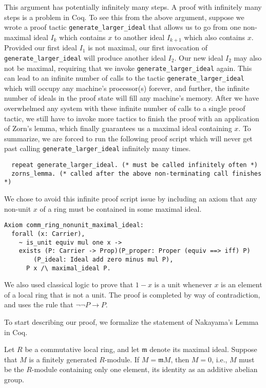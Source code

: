 \documentclass{article}
\begin{document}
This argument has potentially infinitely many steps. A proof with infinitely
many steps is a problem in Coq. To see this from the above argument, suppose we
wrote a proof tactic \texttt{generate_larger_ideal} that allows us to
go from one non-maximal ideal \(I_{k}\) which contains \(x\) to another ideal
\(I_{k+1}\) which also contains \(x\). Provided our first ideal \(I_{1}\) is
not maximal, our first invocation of \texttt{generate_larger_ideal}
will produce another ideal \(I_{2}\). Our new ideal \(I_{2}\) may also not be
maximal, requiring that we invoke \texttt{generate_larger_ideal}
again. This can lead to an infinite number of calls to the tactic
\texttt{generate_larger_ideal} which will occupy any machine's
processor(s) forever, and further, the infinite number of ideals in the proof
state will fill any machine's memory. After we have overwhelmed any system with
these infinite number of calls to a single proof tactic, we still have to
invoke more tactics to finish the proof with an application of Zorn's lemma,
which finally guarantees us a maximal ideal containing \(x\). To summarize, we
are forced to run the following proof script which will never get past calling
\texttt{generate_larger_ideal} infinitely many times.
\begin{verbatim}
  repeat generate_larger_ideal. (* must be called infinitely often *)
  zorns_lemma. (* called after the above non-terminating call finishes *)
\end{verbatim}
We chose to avoid this infinite proof script issue by including an axiom that
any non-unit \(x\) of a ring must be contained in some maximal ideal.

\begin{verbatim}
Axiom comm_ring_nonunit_maximal_ideal:
  forall (x: Carrier),
    ~ is_unit equiv mul one x ->
    exists (P: Carrier -> Prop)(P_proper: Proper (equiv ==> iff) P)
    	(P_ideal: Ideal add zero minus mul P),
      P x /\ maximal_ideal P.
\end{verbatim} 

We also used classical logic to prove that \(1 - x\) is a unit whenever \(x\)
is an element of a local ring that is not a unit. The proof is completed by way
of contradiction, and uses the rule that \(\neg\neg P\rightarrow P\).

To start describing our proof, we formalize the statement of Nakayama's Lemma
in Coq.

\begin{nak*}
Let $R$ be a commutative local ring, and let $\mathfrak{m}$ denote its maximal
ideal. Suppose that $M$ is a finitely generated $R$-module. If
$M = \mathfrak{m} M$, then $M = 0$, i.e., $M$ must be the $R$-module containing
only one element, its identity as an additive abelian group. 
\end{nak*}
\end{document}
